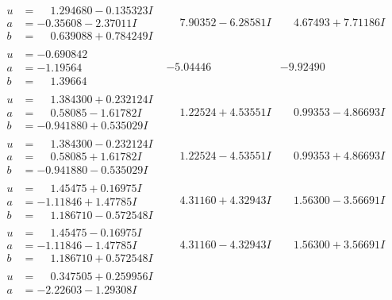\documentclass[1p]{elsarticle_modified}
\theoremstyle{definition}
\begin{document}
$$\begin{array}{c|c|c}
\begin{aligned}
u &= \phantom{-}1.294680 - 0.135323 I \\
a &= -0.35608 - 2.37011 I \\
b &= \phantom{-}0.639088 + 0.784249 I\end{aligned}
 & \phantom{-}7.90352 - 6.28581 I & \phantom{-}4.67493 + 7.71186 I \\ \hline\begin{aligned}
u &= -0.690842\phantom{ +0.000000I} \\
a &= -1.19564\phantom{ +0.000000I} \\
b &= \phantom{-}1.39664\phantom{ +0.000000I}\end{aligned}
 & -5.04446\phantom{ +0.000000I} & -9.92490\phantom{ +0.000000I} \\ \hline\begin{aligned}
u &= \phantom{-}1.384300 + 0.232124 I \\
a &= \phantom{-}0.58085 - 1.61782 I \\
b &= -0.941880 + 0.535029 I\end{aligned}
 & \phantom{-}1.22524 + 4.53551 I & \phantom{-}0.99353 - 4.86693 I \\ \hline\begin{aligned}
u &= \phantom{-}1.384300 - 0.232124 I \\
a &= \phantom{-}0.58085 + 1.61782 I \\
b &= -0.941880 - 0.535029 I\end{aligned}
 & \phantom{-}1.22524 - 4.53551 I & \phantom{-}0.99353 + 4.86693 I \\ \hline\begin{aligned}
u &= \phantom{-}1.45475 + 0.16975 I \\
a &= -1.11846 + 1.47785 I \\
b &= \phantom{-}1.186710 - 0.572548 I\end{aligned}
 & \phantom{-}4.31160 + 4.32943 I & \phantom{-}1.56300 - 3.56691 I \\ \hline\begin{aligned}
u &= \phantom{-}1.45475 - 0.16975 I \\
a &= -1.11846 - 1.47785 I \\
b &= \phantom{-}1.186710 + 0.572548 I\end{aligned}
 & \phantom{-}4.31160 - 4.32943 I & \phantom{-}1.56300 + 3.56691 I \\ \hline\begin{aligned}
u &= \phantom{-}0.347505 + 0.259956 I \\
a &= -2.22603 - 1.29308 I \\

\end{aligned}
\end{array}$$
\end{document}
